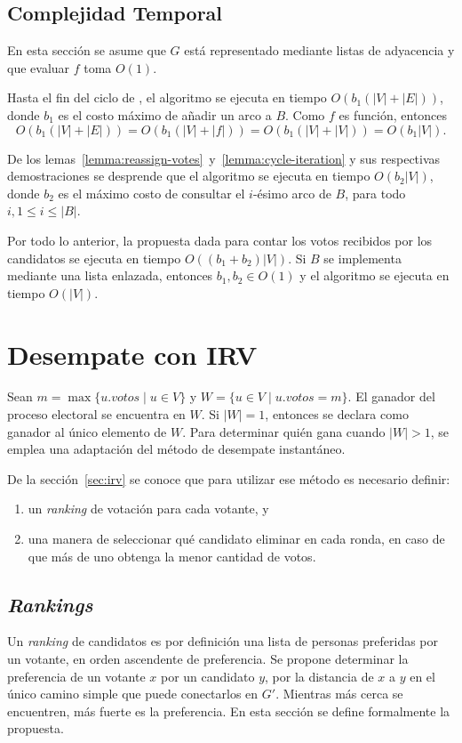 \subsection{Complejidad Temporal}
En esta secci\'on se asume que $G$ est\'a representado mediante listas de adyacencia y que evaluar $f$ toma $O(1)$.

Hasta el fin del ciclo de \dfscaption, el algoritmo se ejecuta en tiempo $O(b_1(|V| + |E|))$, donde $b_1$ es el costo m\'aximo de a\~nadir un arco a $B$. Como $f$ es funci\'on, entonces 
$$
O(b_1(|V| + |E|)) = O(b_1(|V| + |f|)) = O(b_1(|V| + |V|)) = O(b_1|V|).
$$

De los lemas~\ref{lemma:reassign-votes}~y~\ref{lemma:cycle-iteration} y sus respectivas demostraciones se desprende que el algoritmo \cyclevotescaption \;se ejecuta en tiempo $O(b_2|V|)$, donde $b_2$ es el m\'aximo costo de consultar el $i$-\'esimo arco de $B$, para todo $i, 1 \leq i \leq |B|$.

Por todo lo anterior, la propuesta dada para contar los votos recibidos por los candidatos se ejecuta en tiempo $O((b_1 + b_2)|V|)$. Si $B$ se implementa mediante una lista enlazada, entonces $b_1, b_2 \in O(1)$ y el algoritmo \dfscaption \;se ejecuta en tiempo $O(|V|)$.


\section{Desempate con IRV}
Sean $m = \max\{ u.votos \;|\; u \in V \}$ y $W = \{ u \in V \;|\; u.votos = m \}$. El ganador del proceso electoral se encuentra en $W$. Si $|W| = 1$, entonces se declara como ganador al \'unico elemento de $W$. Para determinar qui\'en gana cuando $|W| > 1$, se emplea una adaptaci\'on del m\'etodo de desempate instant\'aneo. 

De la secci\'on~\ref{sec:irv} se conoce que para utilizar ese m\'etodo es necesario definir:
\begin{enumerate}
    \item un \textit{ranking} de votaci\'on para cada votante, y
    \item una manera de seleccionar qu\'e candidato eliminar en cada ronda, en caso de que m\'as de uno  obtenga la menor cantidad de votos.
\end{enumerate}  

\subsection{\textit{Rankings}}
Un \textit{ranking} de candidatos es por definici\'on una lista de personas preferidas por un votante, en orden ascendente de preferencia. Se propone determinar la preferencia de un votante $x$ por  un candidato $y$, por la distancia de $x$ a $y$ en el \'unico camino simple que puede conectarlos en $G'$. Mientras m\'as cerca se encuentren, m\'as fuerte es la preferencia. En esta secci\'on se define formalmente la propuesta.

